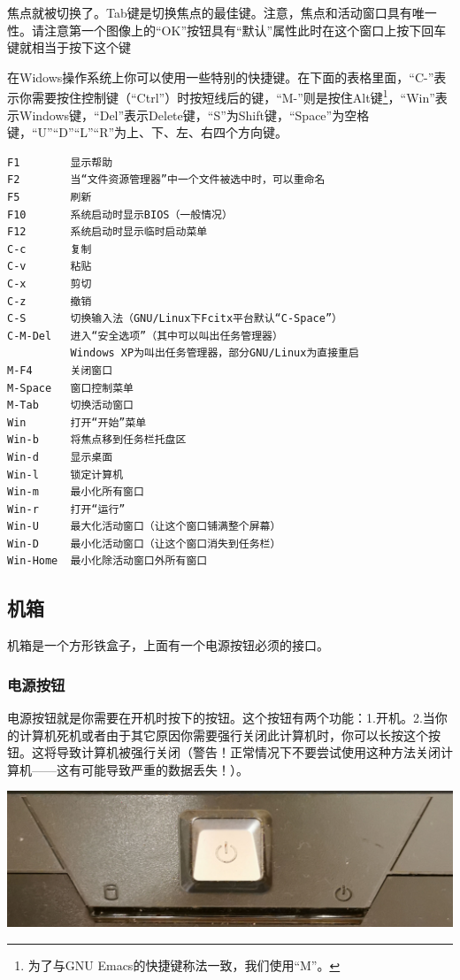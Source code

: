 焦点就被切换了。Tab键是切换焦点的最佳键。注意，焦点和活动窗口具有唯一性。请注意第一个图像上的“OK”按钮具有“默认”属性此时在这个窗口上按下回车键就相当于按下这个键\par
在Widows操作系统上你可以使用一些特别的快捷键。在下面的表格里面，“C-”表示你需要按住控制键（“Ctrl”）时按短线后的键，“M-”则是按住Alt键\footnote{为了与GNU Emacs的快捷键称法一致，我们使用“M”。}，“Win”表示Windows键，“Del”表示Delete键，“S”为Shift键，“Space”为空格键，“U”“D”“L”“R”为上、下、左、右四个方向键。
\begin{verbatim}
F1        显示帮助
F2        当“文件资源管理器”中一个文件被选中时，可以重命名
F5        刷新
F10       系统启动时显示BIOS（一般情况）
F12       系统启动时显示临时启动菜单
C-c       复制
C-v       粘贴
C-x       剪切
C-z       撤销
C-S       切换输入法（GNU/Linux下Fcitx平台默认“C-Space”）
C-M-Del   进入“安全选项”（其中可以叫出任务管理器）
          Windows XP为叫出任务管理器，部分GNU/Linux为直接重启
M-F4      关闭窗口
M-Space   窗口控制菜单
M-Tab     切换活动窗口
Win       打开“开始”菜单
Win-b     将焦点移到任务栏托盘区
Win-d     显示桌面
Win-l     锁定计算机
Win-m     最小化所有窗口
Win-r     打开“运行”
Win-U     最大化活动窗口（让这个窗口铺满整个屏幕）
Win-D     最小化活动窗口（让这个窗口消失到任务栏）
Win-Home  最小化除活动窗口外所有窗口
\end{verbatim}
\subsection{机箱}
机箱是一个方形铁盒子，上面有一个电源按钮必须的接口。
\subsubsection{电源按钮}
电源按钮就是你需要在开机时按下的按钮。这个按钮有两个功能：1.开机。2.当你的计算机死机或者由于其它原因你需要强行关闭此计算机时，你可以长按这个按钮。这将导致计算机被强行关闭（{\color{red}警告！正常情况下不要尝试使用这种方法关闭计算机——这有可能导致严重的数据丢失！}）。
\begin{center}
	\includegraphics[scale=0.06]{pic/StB}
\end{center}\par
